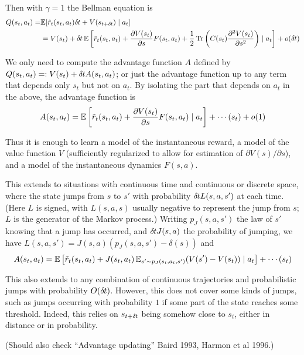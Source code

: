 Then with $\gamma=1$ the Bellman equation is
\begin{align}
Q(s_t,a_t)=&\mathbb{E}[ \tilde{r}_t(s_t,a_t) \delta\hspace{-.06em}t + V(s_{t+\delta\hspace{-.06em}t}) \mid a_t]
\\&=V(s_t)+\delta\hspace{-.06em}t \,\mathbb{E}\left[\tilde{r}_t(s_t,a_t)+\frac{\partial V(s_t)}{\partial
s}F(s_t,a_t)+\frac12 \operatorname{Tr} \left(C(s_t)\frac{\partial^2 V(s_t)}{\partial
s^2}\right)\mid a_t\right]+o(\delta\hspace{-.06em}t)
\end{align}

We only need to compute the advantage function $A$ defined by
$Q(s_t,a_t)=\mathrel{\mathop{:}} V(s_t)+\delta\hspace{-.06em}t A(s_t,a_t)$; or just the advantage function
up to any term that depends only $s_t$ but not on $a_t$. By isolating the
part that
depends on $a_t$ in the above, the advantage function is
\begin{equation}
A(s_t,a_t)=\mathbb{E}\left[\tilde{r}_t(s_t,a_t)+\frac{\partial
V(s_t)}{\partial
s}F(s_t,a_t)\mid a_t\right]+\cdots(s_t)+o(1)
\end{equation}

Thus it is enough to learn a model of the instantaneous reward, a model
of the value function $V$ (sufficiently regularized to allow for
estimation of $\partial V(s)/\partial s$), and a model of the
instantaneous dynamics $F(s,a)$.

This extends to situations with continuous time and continuous or
discrete space, where the state jumps from $s$ to $s'$ with probability $\delta\hspace{-.06em}t
L(s,a,s')$ at each time. (Here $L$ is signed, with $L(s,a,s)$ usually
negative to represent the jump from $s$; $L$ is the generator of the
Markov process.) Writing $p_J(s,a,s')$ the law of
$s'$ knowing that a jump has occurred, and $\delta\hspace{-.06em}t J(s,a)$ the
probability of jumping, we have $L(s,a,s')=J(s,a)(p_J(s,a,s')-\delta(s))$
and
\begin{equation}
A(s_t,a_t)=\mathbb{E}\left[\tilde{r}_t(s_t,a_t)+J(s_t,a_t)\,\mathbb{E}_{s'\sim
p_J(s_t,a_t,s')} (V(s')-V(s_t))
\mid a_t\right]+\cdots(s_t)
\end{equation}

This also extends to any combination of continuous trajectories and
probabilistic jumps with probability $O(\delta\hspace{-.06em}t)$. However, this does not
cover some kinds of jumps, such as jumps occurring with probability $1$
if some part of the state reaches some threshold. Indeed, this relies on
$s_{t+\delta\hspace{-.06em}t}$ being somehow close to $s_t$, either in distance or in
probability.

(Should also check ``Advantage updating'' Baird 1993, Harmon et al 1996.)

